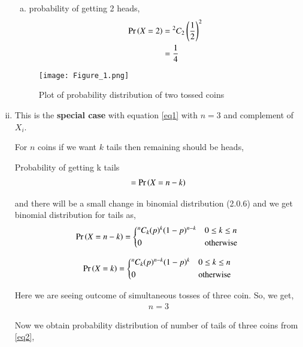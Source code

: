 \documentclass[journal,12pt,twocolumn]{IEEEtran}
\begin{document}
\begin{enumerate}[(i)]
\begin{enumerate}[(a)]
    \item probability of getting 2 heads,
        \begin{align}
            \begin{split}
                \Pr\left(X=2\right) &= {^2C_2}\left(\frac{1}{2}\right)^2\\
                &=\frac{1}{4}
            \end{split}
        \end{align}
\end{enumerate}

\begin{figure}[h!]
    \centering
    \texttt{[image: Figure\_1.png]}
    \caption{Plot of probability distribution of two tossed coins}
    \label{fig:Two coins}
\end{figure}

\vspace{0.2in}

\item
This is the \textbf{special case} with equation \eqref{eq1} with $n=3$ and complement of $X_i$.

For $n$ coins if we want $k$ tails then remaining should be heads,

Probability of getting k tails
\begin{align}
     =\Pr\left(X=n-k\right)
\end{align}

and there will be a small change in binomial distribution (2.0.6) and we get binomial distribution for tails as,
\begin{align}
   \pr{X=n-k} =
  \begin{cases*}
    {^n C_k}(p)^{k}(1-p)^{n-k} & $0 \leq k \leq n$\\
      0 & otherwise
  \end{cases*}
\end{align}

\begin{align}\label{eq2}
   \pr{X=k} =
  \begin{cases*}
    {^n C_k}(p)^{n-k}(1-p)^{k} & $0 \leq k \leq n$\\
      0 & otherwise
  \end{cases*}
\end{align}

Here we are seeing outcome of simultaneous tosses of three coin. So, we get,
\begin{align}
    n=3
\end{align}

Now we obtain probability distribution of number of tails of three coins from \eqref{eq2},


\end{enumerate}
\end{document}
